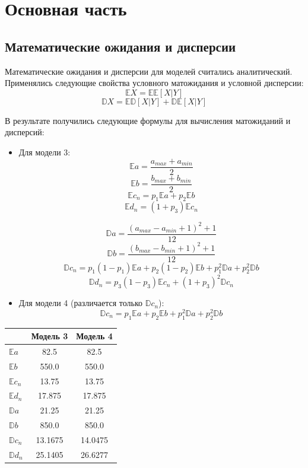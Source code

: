 \documentclass[12pt, a4paper]{article}
\begin{document}
	\newpage
	\section{Основная часть}
		\subsection{Математические ожидания и дисперсии}
			Математические ожидания и дисперсии для моделей считались аналитический. Применялись следующие свойства условного матожидания и условной дисперсии:
			$$\mathbb{E} X = \mathbb{E}\mathbb{E} [X | Y]$$
			$$\mathbb{D} X = \mathbb{E}\mathbb{D} [X | Y] + \mathbb{D}\mathbb{E} [X | Y]$$
			
			В результате получились следующие формулы для вычисления матожиданий и дисперсий:
		
			\begin{itemize}
			    \item Для модели 3:
			    $$\mathbb{E} a = \frac{a_{max} + a_{min}}{2}$$
			    $$\mathbb{E} b = \frac{b_{max} + b_{min}}{2}$$
			    $$\mathbb{E} c_n = p_1 \mathbb{E} a + p_2 \mathbb{E} b$$
			    $$\mathbb{E} d_n = (1 + p_3)\mathbb{E} c_n$$
			    
			    $$\mathbb{D} a = \frac{(a_{max} - a_{min} + 1)^2 + 1}{12}$$
			    $$\mathbb{D} b = \frac{(b_{max} - b_{min} + 1)^2 + 1}{12}$$
			    $$\mathbb{D} c_n = p_1 (1 - p_1) \mathbb{E} a + p_2 (1 - p_2) \mathbb{E} b + p_1^2 \mathbb{D} a + p_2^2 \mathbb{D} b$$
			    $$\mathbb{D} d_n = p_3 (1 - p_3)\mathbb{E} c_n + (1 + p_3)^2 \mathbb{D} c_n$$
			    \item Для модели 4 (различается только $\mathbb{D} c_n$):
			    $$\mathbb{D} c_n = p_1 \mathbb{E} a + p_2 \mathbb{E} b + p_1^2 \mathbb{D} a + p_2^2 \mathbb{D} b$$
			\end{itemize}
			\begin{center}
			\begin{tabular}{| l | c | c |}
				\hline
  				& Модель 3 & Модель 4 \\
  				\hline
  				$\mathbb{E} a$ & 82.5 & 82.5 \\
  				\hline
  				$\mathbb{E} b$ & 550.0 & 550.0 \\
  				\hline
  				$\mathbb{E} c_n$ & 13.75 & 13.75 \\
  				\hline
  				$\mathbb{E} d_n$ & 17.875 & 17.875 \\
  				\hline
  				$\mathbb{D} a$ & 21.25 & 21.25 \\
  				\hline
  				$\mathbb{D} b$ & 850.0 & 850.0 \\
  				\hline
  				$\mathbb{D} c_n$ & 13.1675 & 14.0475 \\
  				\hline
  				$\mathbb{D} d_n$ & 25.1405 & 26.6277 \\
  				\hline
			\end{tabular}
			\end{center}
\end{document}
